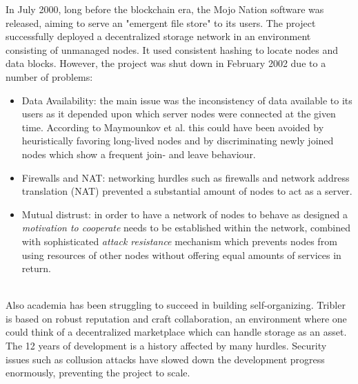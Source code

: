 \documentclass[journal]{IEEEtran}
\begin{document}
In July 2000, long before the blockchain era, the Mojo Nation software \cite{mojo-nation} was released, aiming to serve an "emergent file store" to its users.
The project successfully deployed a decentralized storage network in an environment consisting of unmanaged nodes.
It used consistent hashing \cite{consistent-hashing} to locate nodes and data blocks.
However, the project was shut down in February 2002 due to a number of problems:
\begin{itemize}
\item Data Availability: the main issue was the inconsistency of data available to its users as it depended upon which server nodes were connected at the given time.
According to Maymounkov et al.\cite{peer-to-peer-xor} this could have been avoided by heuristically favoring long-lived nodes and by discriminating newly joined nodes which show a frequent join- and leave behaviour.
\item Firewalls and NAT: networking hurdles such as firewalls and network address translation (NAT) prevented a substantial amount of nodes to act as a server.
\item Mutual distrust: in order to have a network of nodes to behave as designed a \textit{motivation to cooperate} needs to be established within the network, combined with sophisticated \textit{attack resistance} mechanism which prevents nodes from using resources of other nodes without offering equal amounts of services in return.
\end{itemize}
\hfill
\\
Also academia has been struggling to succeed in building self-organizing.
Tribler\cite{tribler} is based on robust reputation and craft collaboration, an environment where one could think of a decentralized marketplace which can handle storage as an asset.
The 12 years of development is a history affected by many hurdles.
Security issues such as collusion attacks\cite{tribler-hurdles} have slowed down the development progress enormously, preventing the project to scale.
\end{document}
